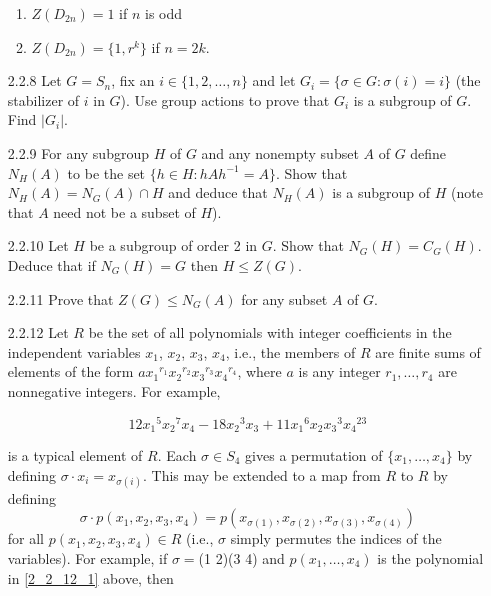 \begin{enumerate}
                  \begin{enumerate}
                     \item $Z(D_{2n}) = 1$ if $n$ is odd
                     \item $Z(D_{2n}) = \{1, r^k\}$ if $n = 2k$.
                  \end{enumerate}
   \item[2.2.8]   Let $G = S_n$, fix an $i \in \{1, 2, \ldots, n\}$ and let
                  $G_i = \{\sigma \in G : \sigma(i) = i\}$ (the stabilizer of
                  $i$ in $G$). Use group actions to prove that $G_i$ is a
                  subgroup of $G$. Find $|G_i|$.
   \item[2.2.9]   For any subgroup $H$ of $G$ and any nonempty subset $A$ of $G$
                  define $N_H(A)$ to be the set $\{h \in H : hAh^{-1} = A\}$.
                  Show that $N_H(A) = N_G(A) \cap H$ and deduce that $N_H(A)$ is
                  a subgroup of $H$ (note that $A$ need not be a subset of $H$).
   \item[2.2.10]  Let $H$ be a subgroup of order 2 in $G$. Show that
                  $N_G(H) = C_G(H)$. Deduce that if $N_G(H) = G$ then
                  $H \le Z(G)$.
   \item[2.2.11]  Prove that $Z(G) \le N_G(A)$ for any subset $A$ of $G$.
   \item[2.2.12]  Let $R$ be the set of all polynomials with integer
                  coefficients in the independent variables $x_1$, $x_2$, $x_3$,
                  $x_4$, i.e., the members of $R$ are finite sums of elements of
                  the form ${ax_1}^{r_1}{x_2}^{r_2}{x_3}^{r_3}{x_4}^{r_4}$,
                  where $a$ is any integer $r_1, \ldots, r_4$ are nonnegative
                  integers. For example,

                  \begin{equation} \label{2_2_12_1}
                     12{x_1}^5{x_2}^7x_4 - 18{x_2}^3x_3 +
                        11{x_1}^6x_2{x_3}^3{x_4}^{23}
                  \end{equation}

                  is a typical element of $R$. Each $\sigma \in S_4$ gives a
                  permutation of $\{x_1, \ldots, x_4\}$ by defining
                  $\sigma \cdot x_i = x_{\sigma(i)}$. This may be extended to a
                  map from $R$ to $R$ by defining
                  $$\sigma \cdot p(x_1, x_2, x_3, x_4) = p(x_{\sigma(1)},
                    x_{\sigma(2)}, x_{\sigma(3)}, x_{\sigma(4)})$$
                  for all $p(x_1, x_2, x_3, x_4) \in R$ (i.e., $\sigma$ simply
                  permutes the indices of the variables). For example, if
                  $\sigma =$(1 2)(3 4) and $p(x_1, \ldots, x_4)$ is the
                  polynomial in \eqref{2_2_12_1} above, then


\end{enumerate}
